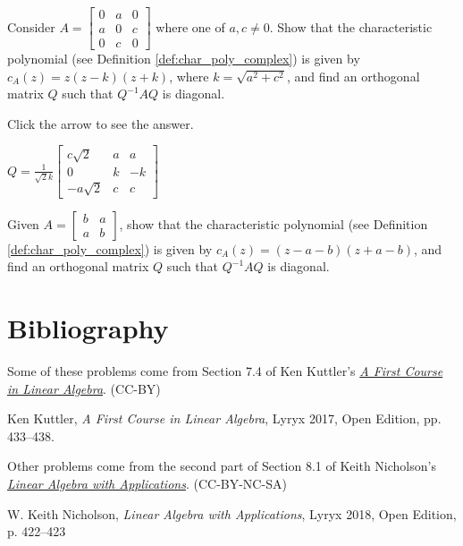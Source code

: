\documentclass{ximera}
\begin{document}
\begin{problem}\label{prob:ortho11}
Consider $A = \begin{bmatrix}
0 & a & 0 \\
a & 0 & c \\
0 & c & 0
\end{bmatrix}$
 where one of $a, c \neq 0$. Show that the characteristic polynomial (see Definition \ref{def:char_poly_complex}) is given by $c_{A}(z) = z(z - k)(z + k)$, where $k = \sqrt{a^2 + c^2}$, and find an orthogonal matrix $Q$ such that $Q^{-1}AQ$ is diagonal.

Click the arrow to see the answer.
\begin{expandable}{}{}
$Q = \frac{1}{\sqrt{2}k}\begin{bmatrix}
c\sqrt{2} & a & a \\
0 & k & -k \\
-a\sqrt{2} & c & c
\end{bmatrix}$
\end{expandable}
\end{problem}

\begin{problem}\label{prob:ortho13}
Given $A = \begin{bmatrix}
b & a \\
a & b
\end{bmatrix}$, show that the characteristic polynomial (see Definition \ref{def:char_poly_complex}) is given by $c_{A}(z) = (z - a - b)(z + a - b)$, and find an orthogonal matrix $Q$ such that $Q^{-1}AQ$ is diagonal.
\end{problem}


\section*{Bibliography}

Some of these problems come from Section 7.4 of Ken Kuttler's \href{https://open.umn.edu/opentextbooks/textbooks/a-first-course-in-linear-algebra-2017}{\it A First Course in Linear Algebra}. (CC-BY)

Ken Kuttler, {\it  A First Course in Linear Algebra}, Lyryx 2017, Open Edition, pp. 433--438.  

Other problems come from the second part of Section 8.1 of Keith Nicholson's \href{https://open.umn.edu/opentextbooks/textbooks/linear-algebra-with-applications}{\it Linear Algebra with Applications}. (CC-BY-NC-SA)

W. Keith Nicholson, {\it Linear Algebra with Applications}, Lyryx 2018, Open Edition, p. 422--423 
\end{document}
